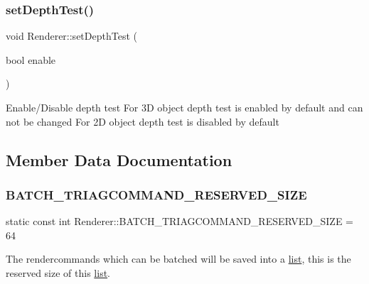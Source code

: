 \subsubsection{\texorpdfstring{set\+Depth\+Test()}{setDepthTest()}\hspace{0.1cm}{\footnotesize\ttfamily [2/2]}}
{\footnotesize\ttfamily void Renderer\+::set\+Depth\+Test (\begin{DoxyParamCaption}\item[{bool}]{enable }\end{DoxyParamCaption})}

Enable/\+Disable depth test For 3D object depth test is enabled by default and can not be changed For 2D object depth test is disabled by default 

\subsection{Member Data Documentation}
\mbox{\label{classRenderer_a9c0c54077070dbc7cf763f90b36aacfe}} 
\subsubsection{\texorpdfstring{B\+A\+T\+C\+H\+\_\+\+T\+R\+I\+A\+G\+C\+O\+M\+M\+A\+N\+D\+\_\+\+R\+E\+S\+E\+R\+V\+E\+D\+\_\+\+S\+I\+ZE}{BATCH\_TRIAGCOMMAND\_RESERVED\_SIZE}}
{\footnotesize\ttfamily static const int Renderer\+::\+B\+A\+T\+C\+H\+\_\+\+T\+R\+I\+A\+G\+C\+O\+M\+M\+A\+N\+D\+\_\+\+R\+E\+S\+E\+R\+V\+E\+D\+\_\+\+S\+I\+ZE = 64\hspace{0.3cm}{\ttfamily [static]}}

The rendercommands which can be batched will be saved into a \hyperlink{protocollist-p}{list}, this is the reserved size of this \hyperlink{protocollist-p}{list}. \mbox{\label{classRenderer_a83bd66787b385c8a009d3cd64af54057}} 
